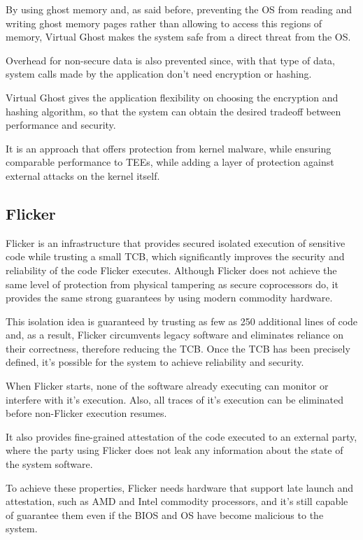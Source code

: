 By using ghost memory and, as said before, preventing the OS from reading and writing ghost memory pages rather than allowing to access this regions of memory, Virtual Ghost makes the system safe from a direct threat from the OS.

Overhead for non-secure data is also prevented since, with that type of data, system calls made by the application don't need encryption or hashing.

Virtual Ghost gives the application flexibility on choosing the encryption and hashing algorithm, so that the system can obtain the desired tradeoff between performance and security.

It is an approach that offers protection from kernel malware, while ensuring comparable performance to TEEs, while adding a layer of protection against external attacks on the kernel itself.



\subsection{Flicker}

Flicker \cite{flickerPaper} is an infrastructure that provides secured isolated execution of sensitive code while trusting a small TCB, which significantly improves the security and reliability of the code Flicker executes. Although Flicker does not achieve the same level of protection from physical tampering as secure coprocessors do, it provides the same strong guarantees by using modern commodity hardware.

This isolation idea is guaranteed by trusting as few as 250 additional lines of code and, as a result, Flicker circumvents legacy software and eliminates reliance on their correctness, therefore reducing the TCB. Once the TCB has been precisely defined, it's possible for the system to achieve reliability and security.  

When Flicker starts, none of the software already executing can monitor or interfere with it's execution. Also, all traces of it's execution can be eliminated before non-Flicker execution resumes.

It also provides fine-grained attestation of the code executed to an external party, where the party using Flicker does not leak any information about the state of the system software. 

To achieve these properties, Flicker needs hardware that support late launch and attestation, such as AMD and Intel commodity processors, and it's still capable of guarantee them even if the BIOS and OS have become malicious to the system.

